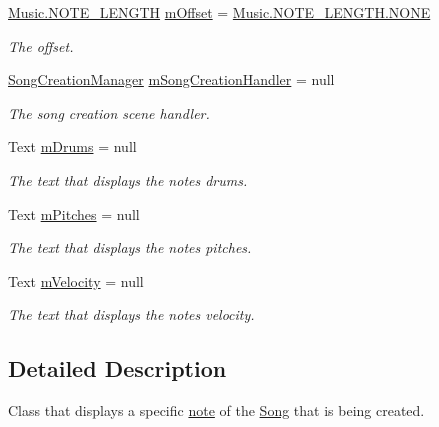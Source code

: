 \begin{DoxyCompactItemize}
\hyperlink{group___music_enums_gaf11b5f079adbb21c800b9eca1c5c3cbd}{Music.\+N\+O\+T\+E\+\_\+\+L\+E\+N\+G\+TH} \hyperlink{group___s_c___n_d_p_priv_var_ga0a78a2c25da29d944d56d1c8ebb74d03}{m\+Offset} = \hyperlink{group___music_enums_ggaf11b5f079adbb21c800b9eca1c5c3cbdab50339a10e1de285ac99d4c3990b8693}{Music.\+N\+O\+T\+E\+\_\+\+L\+E\+N\+G\+T\+H.\+N\+O\+NE}
\begin{DoxyCompactList}\small\item\em The offset. \end{DoxyCompactList}\item 
\hyperlink{class_song_creation_manager}{Song\+Creation\+Manager} \hyperlink{group___s_c___n_d_p_priv_var_ga5e4ae5e7daa568c3e2b471c0835600c6}{m\+Song\+Creation\+Handler} = null
\begin{DoxyCompactList}\small\item\em The song creation scene handler. \end{DoxyCompactList}\item 
Text \hyperlink{group___s_c___n_d_p_priv_var_gadd38ff2acddedee4b6165f2fc48fd43c}{m\+Drums} = null
\begin{DoxyCompactList}\small\item\em The text that displays the note\textquotesingle{}s drums. \end{DoxyCompactList}\item 
Text \hyperlink{group___s_c___n_d_p_priv_var_ga8018aa4f7b333a7129badf082f233a3c}{m\+Pitches} = null
\begin{DoxyCompactList}\small\item\em The text that displays the note\textquotesingle{}s pitches. \end{DoxyCompactList}\item 
Text \hyperlink{group___s_c___n_d_p_priv_var_ga4924aa3f63f171ed33f5f85d11a760c4}{m\+Velocity} = null
\begin{DoxyCompactList}\small\item\em The text that displays the note\textquotesingle{}s velocity. \end{DoxyCompactList}\end{DoxyCompactItemize}


\subsection{Detailed Description}
Class that displays a specific \hyperlink{group___music_structs_struct_music_1_1_combined_note}{note} of the \hyperlink{class_song}{Song} that is being created. 

